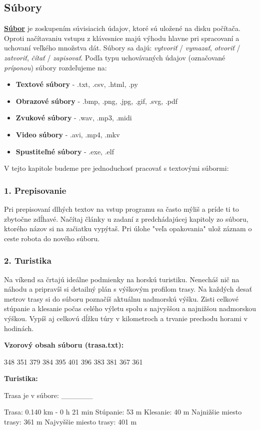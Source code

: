 \subsection{Súbory}
\underline{\textbf{Súbor}} je zoskupením súvisiacich údajov, ktoré sú uložené na disku počítača. Oproti načítavaniu vstupu z klávesnice majú výhodu hlavne pri spracovaní a uchovaní veľkého množstva dát. Súbory sa dajú: \textit{vytvoriť} / \textit{vymazať}, \textit{otvoriť} / \textit{zatvoriť}, \textit{čítať} / \textit{zapisovať}. Podľa typu uchovávaných údajov (označované \textit{príponou}) súbory rozdeľujeme na:

\begin{itemize}
\itemsep0pt
\item \textbf{Textové súbory} - .txt, .csv, .html, .py
\item \textbf{Obrazové súbory} - .bmp, .png, .jpg, .gif, .svg, .pdf
\item \textbf{Zvukové súbory} - .wav, .mp3, .midi
\item \textbf{Video súbory} - .avi, .mp4, .mkv
\item \textbf{Spustiteľné súbory} - .exe, .elf
\end{itemize}

V tejto kapitole budeme pre jednoduchosť pracovať s textovými súbormi:

\subsubsection*{1. Prepisovanie}
Pri prepisovaní dlhých textov na vstup programu sa často mýliš a príde ti to zbytočne zdĺhavé. Načítaj články u zadaní z predchádajúcej kapitoly zo súboru, ktorého názov si na začiatku vypýtaš. Pri úlohe "veľa opakovania" ulož záznam o ceste robota do nového súboru.


\subsubsection*{2. Turistika}
Na víkend sa črtajú ideálne podmienky na horskú turistiku. Nenecháš nič na náhodu a pripravíš si detailný plán s výškovým profilom trasy. Na každých desať metrov trasy si do súboru poznačíš aktuálnu nadmorskú výšku. Zisti celkové stúpanie a klesanie počas celého výletu spolu s najvyššou a najnižšou nadmorskou výškou. Vypíš aj celkovú dĺžku túry v kilometroch a trvanie prechodu horami v hodinách.

\begin{minipage}{.35\textwidth}
\textbf{Vzorový obsah súboru (trasa.txt):}
\begin{code}
348
351
379
384
395
401
396
383
381
367
361
\end{code}
\end{minipage}
\hfill
\begin{minipage}{.45\textwidth}
\textbf{Turistika:}
\begin{code}
Trasa je v súbore: ______

Trasa: 0.140 km - 0 h 21 min
Stúpanie: 53 m
Klesanie: 40 m
Najnižšie miesto trasy: 361 m
Najvyššie miesto trasy: 401 m
\end{code}
\end{minipage}

